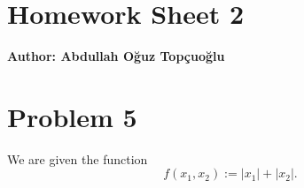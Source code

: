 \documentclass{article}
\begin{document}
\section*{\huge Homework Sheet 2}
\begin{flushright}
   \textbf{Author: Abdullah Oğuz Topçuoğlu}
\end{flushright}


\section*{Problem 5}

We are given the function
\[
   f(x_1, x_2) := |x_1| + |x_2|.
\]
\end{document}
